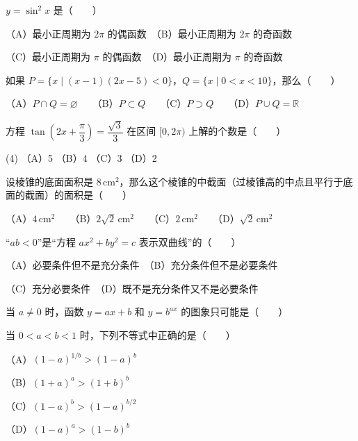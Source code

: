 \begin{question}
$y=\sin^2x$ 是\mbox{（　　）}

（A）最小正周期为 $2\pi$ 的偶函数　（B）最小正周期为 $2\pi$ 的奇函数

（C）最小正周期为 $\pi$ 的偶函数　（D）最小正周期为 $\pi$ 的奇函数

\end{question}
\begin{question}
如果 $P=\{x\mid(x-1)(2x-5)<0\}$，$Q=\{x\mid0<x<10\}$，那么\mbox{（　　）}

（A）$P\cap Q=\varnothing$　　（B）$P\subset Q$　　（C）$P\supset Q$　　（D）$P\cup Q=\mathbb R$

\end{question}
\begin{question}
方程 $\tan\left(2x+\dfrac\pi3\right)=\dfrac{\sqrt3}{3}$ 在区间 $[0,2\pi)$ 上解的个数是\mbox{（　　）}

\begin{gkopts}(4)
\task （A）5
\task （B）4
\task （C）3
\task （D）2
\end{gkopts}

\end{question}
\begin{question}
设棱锥的底面面积是 $8\,\mathrm{cm}^2$，那么这个棱锥的中截面（过棱锥高的中点\allowbreak 且平行于底面的截面）的面积是\allowbreak\mbox{（　　）}

（A）$4\,\mathrm{cm}^2$　　（B）$2\sqrt2\,\mathrm{cm}^2$　　（C）$2\,\mathrm{cm}^2$　　（D）$\sqrt2\,\mathrm{cm}^2$

\end{question}
\begin{question}
“$ab<0$”是“方程 $ax^2+by^2=c$ 表示双曲线”的\mbox{（　　）}

（A）必要条件但不是充分条件　（B）充分条件但不是必要条件

（C）充分必要条件　（D）既不是充分条件又不是必要条件

\Needspace{0.4\textheight}
\end{question}
\begin{question}
当 $a\ne0$ 时，函数 $y=ax+b$ 和 $y=b^{ax}$ 的图象只可能是\mbox{（　　）}
\nopagebreak[4]
\begin{center}\end{center}
\nopagebreak[4]
\end{question}
\begin{question}
当 $0<a<b<1$ 时，下列不等式中正确的是\mbox{（　　）}

（A）$(1-a)^{1/b}>(1-a)^b$

（B）$(1+a)^a>(1+b)^b$

（C）$(1-a)^b>(1-a)^{b/2}$

（D）$(1-a)^a>(1-b)^b$

\end{question}
